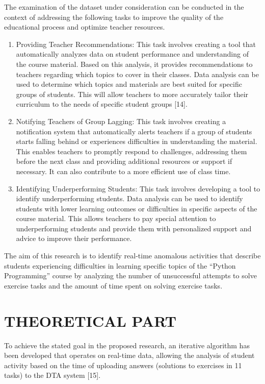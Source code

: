 \documentclass{article}
\begin{document}
\begin{multicols}{2}
\begin{justify}
      The examination of the dataset under consideration can be conducted in the context of addressing the following tasks to improve the quality of the educational process and optimize teacher resources.

      \begin{enumerate}
        \item	Providing Teacher Recommendations: This task involves creating a tool that automatically analyzes data on student performance and understanding of the course material. Based on this analysis, it provides recommendations to teachers regarding which topics to cover in their classes. Data analysis can be used to determine which topics and materials are best suited for specific groups of students. This will allow teachers to more accurately tailor their curriculum to the needs of specific student groups [14].
        \item	Notifying Teachers of Group Lagging: This task involves creating a notification system that automatically alerts teachers if a group of students starts falling behind or experiences difficulties in understanding the material. This enables teachers to promptly respond to challenges, addressing them before the next class and providing additional resources or support if necessary. It can also contribute to a more efficient use of class time.
        \item	Identifying Underperforming Students: This task involves developing a tool to identify underperforming students. Data analysis can be used to identify students with lower learning outcomes or difficulties in specific aspects of the course material. This allows teachers to pay special attention to underperforming students and provide them with personalized support and advice to improve their performance.
      \end{enumerate}
      The aim of this research is to identify real-time anomalous activities that describe students experiencing difficulties in learning specific topics of the “Python Programming” course by analyzing the number of unsuccessful attempts to solve exercise tasks and the amount of time spent on solving exercise tasks.
      \section{THEORETICAL PART}
      To achieve the stated goal in the proposed research, an iterative algorithm has been developed that operates on real-time data, allowing the analysis of student activity based on the time of uploading answers (solutions to exercises in 11 tasks) to the DTA system [15].


\end{justify}
\end{multicols}
\end{document}
